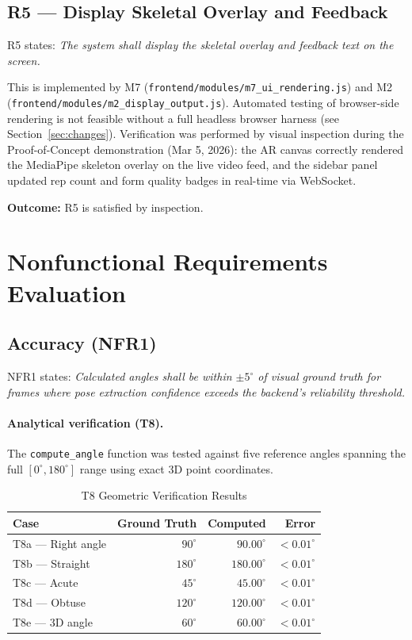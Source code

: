 \documentclass[12pt, titlepage]{article}
\begin{document}
\subsection{R5 --- Display Skeletal Overlay and Feedback}

R5 states: \textit{The system shall display the skeletal overlay and feedback
text on the screen.}

This is implemented by M7 (\texttt{frontend/modules/m7\_ui\_rendering.js})
and M2 (\texttt{frontend/modules/m2\_display\_output.js}). Automated testing
of browser-side rendering is not feasible without a full headless browser
harness (see Section~\ref{sec:changes}). Verification was performed by visual
inspection during the Proof-of-Concept demonstration (Mar 5, 2026): the AR
canvas correctly rendered the MediaPipe skeleton overlay on the live video feed,
and the sidebar panel updated rep count and form quality badges in real-time
via WebSocket.

\textbf{Outcome:} R5 is satisfied by inspection.

\section{Nonfunctional Requirements Evaluation}
\label{sec:nfunc}

\subsection{Accuracy (NFR1)}

NFR1 states: \textit{Calculated angles shall be within $\pm 5^\circ$ of
visual ground truth for frames where pose extraction confidence exceeds the
backend's reliability threshold.}

\paragraph{Analytical verification (T8).}
The \texttt{compute\_angle} function was tested against five reference angles
spanning the full $[0^\circ, 180^\circ]$ range using exact 3D point coordinates.

\begin{table}[H]
\centering
\begin{tabular}{l r r r}
\toprule
\textbf{Case} & \textbf{Ground Truth} & \textbf{Computed} & \textbf{Error}\\
\midrule
T8a --- Right angle  & $90^\circ$  & $90.00^\circ$  & $< 0.01^\circ$ \\
T8b --- Straight     & $180^\circ$ & $180.00^\circ$ & $< 0.01^\circ$ \\
T8c --- Acute        & $45^\circ$  & $45.00^\circ$  & $< 0.01^\circ$ \\
T8d --- Obtuse       & $120^\circ$ & $120.00^\circ$ & $< 0.01^\circ$ \\
T8e --- 3D angle     & $60^\circ$  & $60.00^\circ$  & $< 0.01^\circ$ \\
\bottomrule
\end{tabular}
\caption{T8 Geometric Verification Results}
\label{tab:t8}
\end{table}
\end{document}
